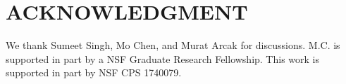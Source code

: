 \documentclass[letterpaper, 10 pt, conference]{ieeeconf}  %
\begin{document}



\section*{ACKNOWLEDGMENT}
We thank Sumeet Singh, Mo Chen, and Murat Arcak for discussions.
M.C. is supported in part by a NSF Graduate Research Fellowship.
This work is supported in part by NSF CPS 1740079.
\end{document}
